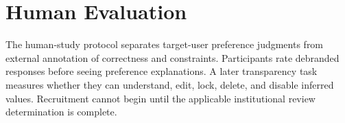 \section{Human Evaluation}
\label{sec:human}

The human-study protocol separates target-user preference judgments from external
annotation of correctness and constraints. Participants rate debranded responses
before seeing preference explanations. A later transparency task measures whether
they can understand, edit, lock, delete, and disable inferred values. Recruitment
cannot begin until the applicable institutional review determination is complete.

